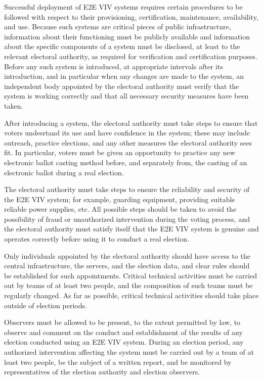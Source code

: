 Successful deployment of E2E VIV systems requires certain procedures
to be followed with respect to their provisioning, certification,
maintenance, availability, and use. Because such systems are critical
pieces of public infrastructure, information about their functioning
must be publicly available and information about the specific
components of a system must be disclosed, at least to the relevant
electoral authority, as required for verification and certification
purposes. Before any such system is introduced, at appropriate
intervals after its introduction, and in particular when any changes
are made to the system, an independent body appointed by the electoral
authority must verify that the system is working correctly and that
all necessary security measures have been taken.

After introducing a system, the electoral authority must take steps to
ensure that voters undesrtand its use and have confidence in the
system; these may include outreach, practice elections, and any other
measures the electoral authority sees fit. In particular, voters must
be given an opportunity to practice any new electronic ballot casting
method before, and separately from, the casting of an electronic
ballot during a real election.

The electoral authority must take steps to ensure the reliability and
security of the E2E VIV system; for example, guarding equipment,
providing suitable reliable power supplies, etc. All possible steps
should be taken to avoid the possibility of fraud or unauthorized
intervention during the voting process, and the electoral authority
must satisfy itself that the E2E VIV system is genuine and operates
correctly before using it to conduct a real election. 

Only individuals appointed by the electoral authority should have
access to the central infrastructure, the servers, and the election
data, and clear rules should be established for such
appointments. Critical technical activities must be carried out by
teams of at least two people, and the composition of such teams must
be regularly changed. As far as possible, critical technical
activities should take place outside of election periods. 

Observers must be allowed to be present, to the extent permitted by
law, to observe and comment on the conduct and establishment of the
results of any election conducted using an E2E VIV system. During an
election period, any authorized intervention affecting the system must
be carried out by a team of at least two people, be the subject of a
written report, and be monitored by representatives of the election
authority and election observers.

